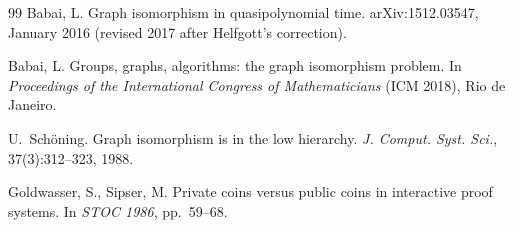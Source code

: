 \documentclass[11pt,a4paper]{amsart}
\theoremstyle{plain}
\theoremstyle{definition}
\begin{document}
\begin{thebibliography}{99}
Babai, L.
\newblock Graph isomorphism in quasipolynomial time.
\newblock arXiv:1512.03547, January 2016 (revised 2017 after Helfgott's correction).

Babai, L.
\newblock Groups, graphs, algorithms: the graph isomorphism problem.
\newblock In \emph{Proceedings of the International Congress of Mathematicians} (ICM 2018), Rio de Janeiro.

U.~Sch\"oning.
\newblock Graph isomorphism is in the low hierarchy.
\newblock \emph{J. Comput. Syst. Sci.}, 37(3):312--323, 1988.

Goldwasser, S., Sipser, M.
\newblock Private coins versus public coins in interactive proof systems.
\newblock In \emph{STOC 1986}, pp.~59--68.

\end{thebibliography}
\end{document}
